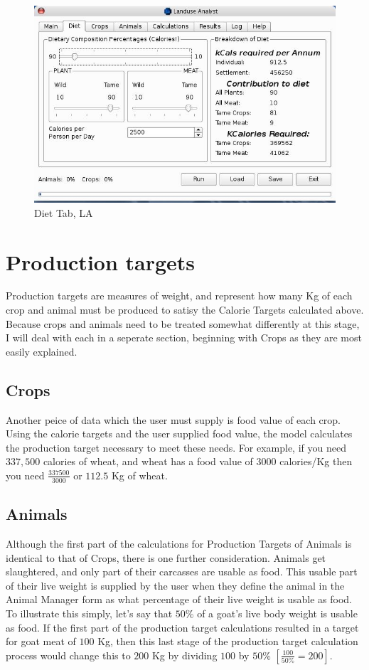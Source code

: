 \begin{figure}[htbp]
  \label{fig:LADiet}%
    \includegraphics[scale=.355]{./images/LanduseAnalystDiet545.jpg}
  \caption{ Diet Tab, LA}
\end{figure}

\section{Production targets}
  Production targets are measures of weight, and represent how many Kg of each crop and animal must be produced to satisy the Calorie Targets calculated above.  Because crops and animals need to be treated somewhat differently at this stage, I will deal with each in a seperate section, beginning with Crops as they are most easily explained.

  \subsection{Crops}
  Another peice of data which the user must supply is food value of each crop.  Using the calorie targets and the user supplied food value, the model calculates the production target necessary to meet these needs.  For example, if you need $337,500$ calories of wheat, and wheat has a food value of $3000$ calories/Kg then you need $\frac{337500}{3000}$ or $112.5$ Kg of wheat.

  \subsection{Animals}
  Although the first part of the calculations for Production Targets of Animals is identical to that of Crops, there is one further consideration.  Animals get slaughtered, and only part of their carcasses are usable as food.  This usable part of their live weight is supplied by the user when they define the animal in the Animal Manager form as what percentage of their live weight is usable as food.  To illustrate this simply, let's say that $50\%$ of a goat's live body weight is usable as food.  If the first part of the production target calculations resulted in a target for goat meat of $100$ Kg, then this last stage of the production target calculation process would change this to $200$ Kg by dividing $100$ by $50\%$   $\left[ \frac{100}{50\%}=200\right]$.

